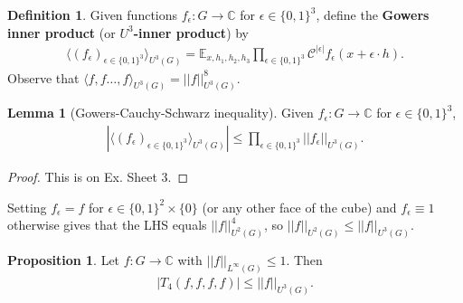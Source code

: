 \documentclass{article}
\theoremstyle{definition}
\newtheorem{lemma}[theorem]{Lemma}
\newtheorem{prop}[theorem]{Proposition}
\newtheorem{defn}[theorem]{Definition}
\begin{document}
\begin{defn}\label{defn4.9}
    Given functions $f_{\epsilon} : G \to \mathbb{C}$ for $\epsilon \in \{0,1\}^3$, define the \textbf{Gowers inner product} (or \textbf{$U^3$-inner product}) by 
    \begin{align*}
        \langle (f_{\epsilon})_{\epsilon \in \{0,1\}^3} \rangle_{U^3(G)} = \mathbb{E}_{x,h_1,h_2,h_3} \prod_{\epsilon \in \{0,1\}^3}^{} \mathcal{C}^{\left|\epsilon\right|} f_{\epsilon}(x+\epsilon\cdot h).
    \end{align*}
    Observe that $\langle f,f\ldots,f \rangle_{U^3(G)} = ||f||_{U^3(G)}^8$.
\end{defn}
\begin{lemma}[Gowers-Cauchy-Schwarz inequality]\label{lemma4.10}
    Given $f_\epsilon : G \to \mathbb{C}$ for $\epsilon \in \{0,1\}^3$,
    \begin{align*}
        \left|\langle (f_\epsilon)_{\epsilon \in \{0,1\}^3} \rangle_{U^3(G)}\right| \le \prod_{\epsilon \in \{0,1\}^3}^{} ||f_\epsilon||_{U^3(G)}. 
    \end{align*}
\end{lemma}
\begin{proof}
    This is on Ex. Sheet 3. 
\end{proof}
Setting $f_\epsilon = f$ for $\epsilon \in \{0,1\}^2 \times \{0\}$ (or any other face of the cube) and $f_{\epsilon} \equiv 1$ otherwise gives that the LHS equals $||f||_{U^2(G)}^4$, so $||f||_{U^2(G)}\le ||f||_{U^3(G)}$.
\begin{prop}\label{prop4.11}
    Let $f : G \to \mathbb{C}$ with $||f||_{L^{\infty}(G)}\le 1$. Then 
    \begin{align*}
        \left|T_4(f,f,f,f)\right|\le ||f||_{U^3(G)}.
    \end{align*}
\end{prop}
\end{document}
